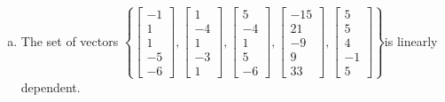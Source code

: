 \begin{exerciseAnswer}
\begin{enumerate}[(a)]
\item  The set of vectors \( \left\{ \left[\begin{array}{c}
-1 \\
1 \\
1 \\
-5 \\
-6
\end{array}\right] , \left[\begin{array}{c}
1 \\
-4 \\
1 \\
-3 \\
1
\end{array}\right] , \left[\begin{array}{c}
5 \\
-4 \\
1 \\
5 \\
-6
\end{array}\right] , \left[\begin{array}{c}
-15 \\
21 \\
-9 \\
9 \\
33
\end{array}\right] , \left[\begin{array}{c}
5 \\
5 \\
4 \\
-1 \\
5
\end{array}\right] \right\} \)is linearly dependent.
\end{enumerate}
    
\end{exerciseAnswer}
    
